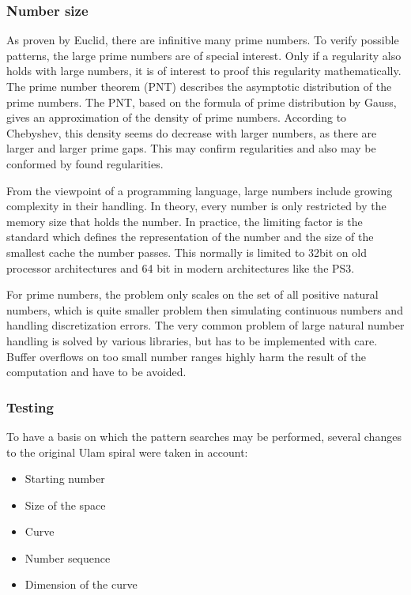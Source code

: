 \subsubsection{Number size}
\label{sec:number_size}
As proven by Euclid, there are infinitive many prime numbers. To verify possible patterns, the large prime numbers are of special interest. Only if a regularity also holds with large numbers, it is of interest to proof this regularity mathematically.
The prime number theorem (PNT) describes the asymptotic distribution of the prime numbers. The PNT, based on the formula of prime distribution by Gauss, gives an approximation of the density of prime numbers. According to Chebyshev, this density seems do decrease with larger numbers, as there are larger and larger prime gaps. This may confirm regularities and also may be conformed by found regularities.

From the viewpoint of a programming language, large numbers include growing complexity in their handling. In theory, every number is only restricted by the memory size that holds the number. In practice, the limiting factor is the standard which defines the representation of the number and the size of the smallest cache the number passes. This normally is limited to 32bit on old processor architectures and 64 bit in modern architectures like the PS3.

For prime numbers, the problem only scales on the set of all positive natural numbers, which is quite smaller problem then simulating continuous numbers and handling discretization errors. The  very common problem of large natural number handling is solved by various libraries, but has to be implemented with care. Buffer overflows on too small number ranges highly harm the result of the computation and have to be avoided.

\subsubsection{Testing}
\label{sec:tests}
To have a basis on which the pattern searches may be performed, several changes to the original Ulam spiral were taken in account:

\begin{itemize}%
   \item Starting number
   \item Size of the space
   \item Curve
   \item Number sequence
   \item Dimension of the curve   
\end{itemize}%


